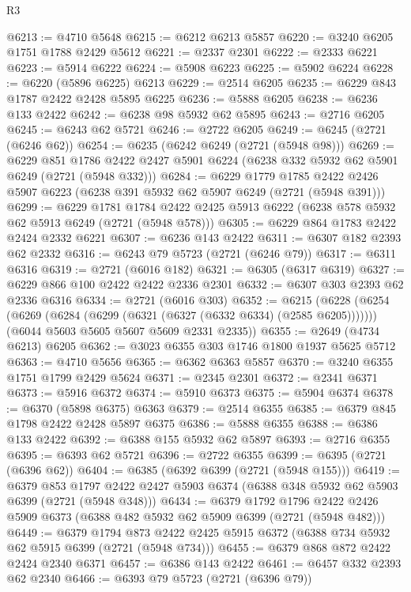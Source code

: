 \begin{lexlean}{R3}
\begin{coremodule}
@6213 := @4710 @5648
@6215 := @6212 @6213 @5857
@6220 := @3240 @6205 @1751 @1788 @2429 @5612
@6221 := @2337 @2301
@6222 := @2333 @6221
@6223 := @5914 @6222
@6224 := @5908 @6223
@6225 := @5902 @6224
@6228 := @6220 (@5896 @6225) @6213
@6229 := @2514 @6205
@6235 := @6229 @843 @1787 @2422 @2428 @5895 @6225
@6236 := @5888 @6205
@6238 := @6236 @133 @2422
@6242 := @6238 @98 @5932 @62 @5895
@6243 := @2716 @6205
@6245 := @6243 @62 @5721
@6246 := @2722 @6205
@6249 := @6245 (@2721 (@6246 @62))
@6254 := @6235 (@6242 @6249 (@2721 (@5948 @98)))
@6269 := @6229
    @851
    @1786
    @2422
    @2427
    @5901
    @6224
    (@6238 @332 @5932 @62 @5901 @6249 (@2721 (@5948 @332)))
@6284 := @6229
    @1779
    @1785
    @2422
    @2426
    @5907
    @6223
    (@6238 @391 @5932 @62 @5907 @6249 (@2721 (@5948 @391)))
@6299 := @6229
    @1781
    @1784
    @2422
    @2425
    @5913
    @6222
    (@6238 @578 @5932 @62 @5913 @6249 (@2721 (@5948 @578)))
@6305 := @6229 @864 @1783 @2422 @2424 @2332 @6221
@6307 := @6236 @143 @2422
@6311 := @6307 @182 @2393 @62 @2332
@6316 := @6243 @79 @5723 (@2721 (@6246 @79))
@6317 := @6311 @6316
@6319 := @2721 (@6016 @182)
@6321 := @6305 (@6317 @6319)
@6327 := @6229 @866 @100 @2422 @2422 @2336 @2301
@6332 := @6307 @303 @2393 @62 @2336 @6316
@6334 := @2721 (@6016 @303)
@6352 := @6215
    (@6228
      (@6254 (@6269 (@6284 (@6299 (@6321 (@6327 (@6332 @6334) (@2585 @6205)))))))
      (@6044 @5603 @5605 @5607 @5609 @2331 @2335))
@6355 := @2649 (@4734 @6213) @6205
@6362 := @3023 @6355 @303 @1746 @1800 @1937 @5625 @5712
@6363 := @4710 @5656
@6365 := @6362 @6363 @5857
@6370 := @3240 @6355 @1751 @1799 @2429 @5624
@6371 := @2345 @2301
@6372 := @2341 @6371
@6373 := @5916 @6372
@6374 := @5910 @6373
@6375 := @5904 @6374
@6378 := @6370 (@5898 @6375) @6363
@6379 := @2514 @6355
@6385 := @6379 @845 @1798 @2422 @2428 @5897 @6375
@6386 := @5888 @6355
@6388 := @6386 @133 @2422
@6392 := @6388 @155 @5932 @62 @5897
@6393 := @2716 @6355
@6395 := @6393 @62 @5721
@6396 := @2722 @6355
@6399 := @6395 (@2721 (@6396 @62))
@6404 := @6385 (@6392 @6399 (@2721 (@5948 @155)))
@6419 := @6379
    @853
    @1797
    @2422
    @2427
    @5903
    @6374
    (@6388 @348 @5932 @62 @5903 @6399 (@2721 (@5948 @348)))
@6434 := @6379
    @1792
    @1796
    @2422
    @2426
    @5909
    @6373
    (@6388 @482 @5932 @62 @5909 @6399 (@2721 (@5948 @482)))
@6449 := @6379
    @1794
    @873
    @2422
    @2425
    @5915
    @6372
    (@6388 @734 @5932 @62 @5915 @6399 (@2721 (@5948 @734)))
@6455 := @6379 @868 @872 @2422 @2424 @2340 @6371
@6457 := @6386 @143 @2422
@6461 := @6457 @332 @2393 @62 @2340
@6466 := @6393 @79 @5723 (@2721 (@6396 @79))

\end{coremodule}
\end{lexlean}
